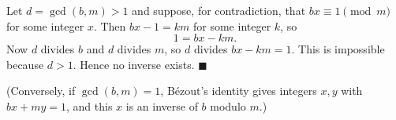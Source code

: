 Let $d=\gcd(b,m)>1$ and suppose, for contradiction, that $bx\equiv1\pmod m$ for some integer $x$. Then $bx-1=km$ for some integer $k$, so
\[
1=bx-km .
\]
Now $d$ divides $b$ and $d$ divides $m$, so $d$ divides $bx-km=1$. This is impossible because $d>1$. Hence no inverse exists. $\blacksquare$

(Conversely, if $\gcd(b,m)=1$, B\'ezout's identity gives integers $x,y$ with $bx+my=1$, and this $x$ is an inverse of $b$ modulo $m$.)
